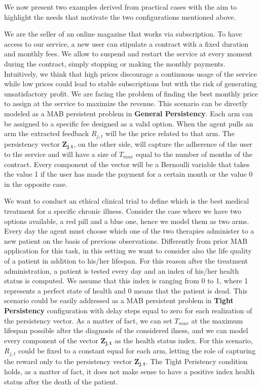 We now present two examples derived from practical cases with the aim to highlight the needs that motivate the two configurations mentioned above. 
\begin{example}
	We are the seller of an online magazine that works via subscription. To have access to our service, a new user can stipulate a contract with a fixed duration and monthly fees. We allow to suspend and restart the service at every moment during the contract, simply stopping or making the monthly payments. Intuitively, we think that high prices discourage a continuous usage of the service while low prices could lead to stable subscriptions but with the risk of generating unsatisfactory profit. We are facing the problem of finding the best monthly price to assign at the service to maximize the revenue. This scenario can be directly modeled as a MAB persistent problem in \textbf{General Persistency}. Each arm can be assigned to a specific fee designed as a valid option. When the agent pulls an arm the extracted feedback $R_{j,t}$ will be the price related to that arm. The persistency vector $\boldsymbol{Z_{j,t}}$, on the other side, will capture the adherence of the user to the service and will have a size of $T_{max}$ equal to the number of months of the contract. Every component of the vector will be a Bernoulli variable that takes the value 1 if the user has made the payment for a certain month or the value 0 in the opposite case.
	\label{magazine}
\end{example}
\begin{example}
	\label{trial}
	We want to conduct an ethical clinical trial to define which is the best medical treatment for a specific chronic illness. Consider the case where we have two options available, a red pill and a blue one, hence we model them as two arms. Every day the agent must choose which one of the two therapies administer to a new patient on the basis of previous observations. Differently from prior MAB application for this task, in this setting we want to consider also the life quality of a patient in addition to his/her lifespan. For this reason after the treatment administration, a patient is tested every day and an index of his/her health status is computed. We assume that this index is ranging from 0 to 1, where 1 represents a perfect state of health and 0 means that the patient is dead. This scenario could be easily addressed as a MAB persistent problem in \textbf{Tight Persistency} configuration with delay steps equal to zero for each realization of the persistency vector. As a matter of fact, we can set $T_{max}$ at the maximum lifespan possible after the diagnosis of the considered ilness, and we can model every component of the vector $\boldsymbol{ Z_ {j, t}} $ as the health status index. For this scenario, $R_{j,t}$ could be fixed to a constant equal for each arm, letting the role of capturing the reward only to the persistency vector $\boldsymbol{ Z_ {j, t}}$. The Tight Peristency condition holds, as a matter of fact, it does not make sense to have a positive index health status after the death of the patient. 
\end{example}

